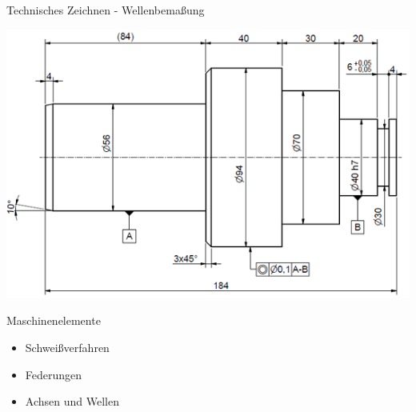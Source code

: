 \documentclass[11pt]{beamer}
\begin{document}





\begin{frame}{Technisches Zeichnen - Wellenbemaßung}

\begin{center}
\includegraphics[scale=0.5]{welle.png}
\end{center}

	
\end{frame}











\begin{frame}{Maschinenelemente}
	
\begin{itemize}
\item Schweißverfahren
\item Federungen
\item Achsen und Wellen
\end{itemize}
	
	
\end{frame}
\end{document}
